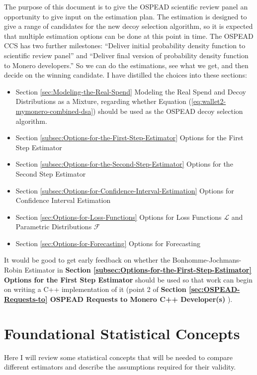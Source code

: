 \documentclass[english]{article}
\begin{document}
The purpose of this document is to give the OSPEAD scientific review
panel an opportunity to give input on the estimation plan. The estimation
is designed to give a range of candidates for the new decoy selection
algorithm, so it is expected that multiple estimation options can
be done at this point in time. The OSPEAD CCS has two further milestones:
``Deliver initial probability density function to scientific review
panel'' and ``Deliver final version of probability density function
to Monero developers.'' So we can do the estimations, see what we
get, and then decide on the winning candidate. I have distilled the
choices into these sections:
\begin{itemize}
\item Section \ref{sec:Modeling-the-Real-Spend} Modeling the Real Spend
and Decoy Distributions as a Mixture, regarding whether Equation (\ref{eq:wallet2-mymonero-combined-dsa})
should be used as the OSPEAD decoy selection algorithm.
\item Section \ref{subsec:Options-for-the-First-Step-Estimator} Options
for the First Step Estimator
\item Section \ref{subsec:Options-for-the-Second-Step-Estimator} Options
for the Second Step Estimator
\item Section \ref{subsec:Options-for-Confidence-Interval-Estimation} Options
for Confidence Interval Estimation
\item Section \ref{sec:Options-for-Loss-Functions} Options for Loss Functions
$\mathcal{L}$ and Parametric Distributions $\mathcal{F}$
\item Section \ref{sec:Options-for-Forecasting} Options for Forecasting
\end{itemize}
It would be good to get early feedback on whether the Bonhomme-Jochmans-Robin
Estimator in \textbf{Section \ref{subsec:Options-for-the-First-Step-Estimator}
Options for the First Step Estimator} should be used so that work
can begin on writing a C++ implementation of it (point 2 of\textbf{
Section \ref{sec:OSPEAD-Requests-to} OSPEAD Requests to Monero C++
Developer(s)} ).

\section{Foundational Statistical Concepts\label{sec:Foundational-Statistical-Concepts}}

Here I will review some statistical concepts that will be needed to
compare different estimators and describe the assumptions required
for their validity.
\end{document}
